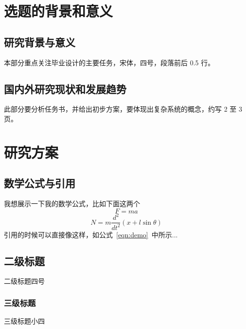 \documentclass[UTF8,AutoFakeBold,AutoFakeSlant,zihao=-4]{ctexart}
\numberwithin{equation}{section}
\begin{document}
\newpage
\section{选题的背景和意义}
\begin{ubox}
\setcounter{figure}{0}
\setcounter{table}{0}
\setlength{\baselineskip}{22pt}
\subsection{研究背景与意义}
本部分重点关注毕业设计的主要任务，宋体，四号，段落前后 0.5 行。

\subsection{国内外研究现状和发展趋势}
此部分要分析任务书，并给出初步方案，要体现出复杂系统的概念，约写 2 至 3 页。
\end{ubox}



\newpage
\section{研究方案}
\begin{ubox}
\setcounter{figure}{0}
\setcounter{table}{0}
\setlength{\baselineskip}{22pt}
\subsection{数学公式与引用}

我想展示一下我的数学公式，比如下面这两个
\begin{equation}\label{eqn:demo}
	F = ma
\end{equation}
\begin{equation}
	N=m \frac{d^{2}}{d t^{2}}(x+l \sin \theta)
\end{equation}
引用的时候可以直接像这样，如公式~\ref{eqn:demo}~中所示...


\subsection{二级标题}

二级标题四号

\subsubsection{三级标题}

三级标题小四

\end{ubox}
\end{document}
